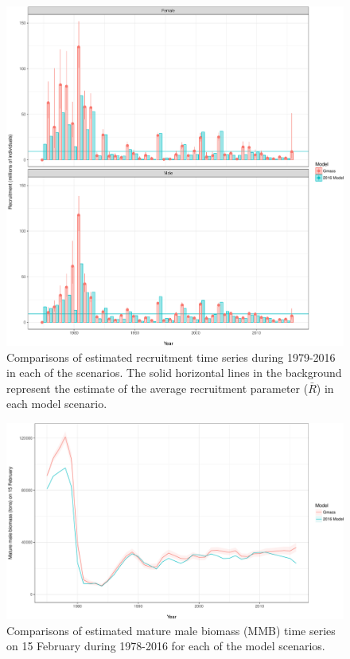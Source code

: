 \documentclass[]{article}
\begin{document}
\begin{figure}[htbp]
\centering
\includegraphics{bbrkc_files/figure-latex/recruitment-1.pdf}
\caption{Comparisons of estimated recruitment time series during
1979-2016 in each of the scenarios. The solid horizontal lines in the
background represent the estimate of the average recruitment parameter
(\(\bar{R}\)) in each model scenario.\label{fig:recruitment}}
\end{figure}

\begin{figure}[htbp]
\centering
\includegraphics{bbrkc_files/figure-latex/mature_male_biomass-1.pdf}
\caption{Comparisons of estimated mature male biomass (MMB) time series
on 15 February during 1978-2016 for each of the model
scenarios.\label{fig:mmb}}
\end{figure}
\end{document}
